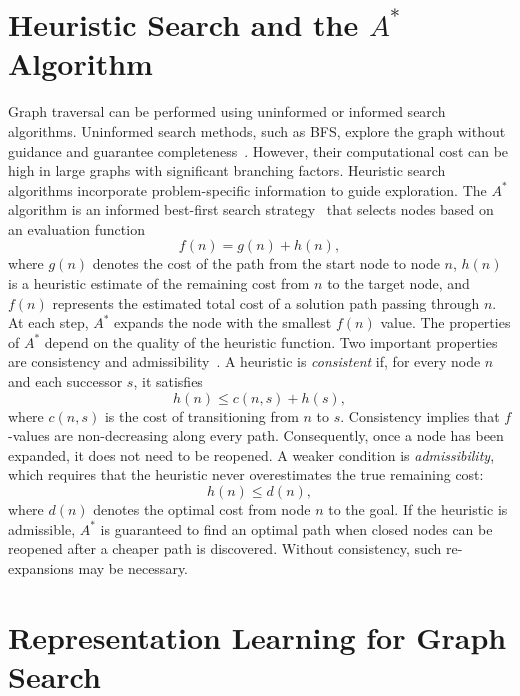 \section{Heuristic Search and the \texorpdfstring{$A^*$}{A*} Algorithm}
\label{sec:foundations_astar}

Graph traversal can be performed using uninformed or informed search algorithms. Uninformed search methods, such as BFS, explore the graph without guidance and guarantee completeness~\cite{cormen:2022}. However, their computational cost can be high in large graphs with significant branching factors. Heuristic search algorithms incorporate problem-specific information to guide exploration. The $A^*$ algorithm is an informed best-first search strategy~\cite{hart:1968} that selects nodes based on an evaluation function
\[
f(n) = g(n) + h(n),
\]
where $g(n)$ denotes the cost of the path from the start node to node $n$, $h(n)$ is a heuristic estimate of the remaining cost from $n$ to the target node, and $f(n)$ represents the estimated total cost of a solution path passing through $n$. At each step, $A^*$ expands the node with the smallest $f(n)$ value. The properties of $A^*$ depend on the quality of the heuristic function. Two important properties are consistency and admissibility~\cite{hart:1968}. A heuristic is \emph{consistent} if, for every node $n$ and each successor $s$, it satisfies
\[
h(n) \leq c(n,s) + h(s),
\]
where $c(n,s)$ is the cost of transitioning from $n$ to $s$. Consistency implies that $f$-values are non-decreasing along every path. Consequently, once a node has been expanded, it does not need to be reopened. A weaker condition is \emph{admissibility}, which requires that the heuristic never overestimates the true remaining cost:
\[
h(n) \leq d(n),
\]
where $d(n)$ denotes the optimal cost from node $n$ to the goal. If the heuristic is admissible, $A^*$ is guaranteed to find an optimal path when closed nodes can be reopened after a cheaper path is discovered. Without consistency, such re-expansions may be necessary.

\section{Representation Learning for Graph Search}
\label{sec:foundations_repr}

